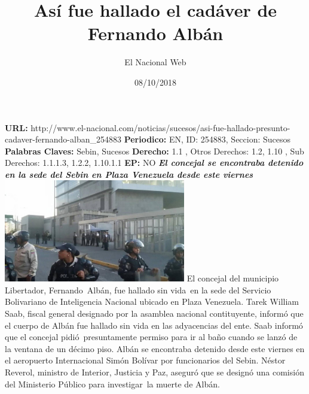 \documentclass{article}%
\title{\textbf{Así fue hallado el cadáver de Fernando Albán}}%
\author{El Nacional Web}%
\date{08/10/2018}%
\begin{document}
%
\normalsize%
\maketitle%
\textbf{URL: }%
http://www.el{-}nacional.com/noticias/sucesos/asi{-}fue{-}hallado{-}presunto{-}cadaver{-}fernando{-}alban\_254883\newline%
%
\textbf{Periodico: }%
EN, %
ID: %
254883, %
Seccion: %
Sucesos\newline%
%
\textbf{Palabras Claves: }%
Sebin, Sucesos\newline%
%
\textbf{Derecho: }%
1.1%
, Otros Derechos: %
1.2, 1.10%
, Sub Derechos: %
1.1.1.3, 1.2.2, 1.10.1.1%
\newline%
%
\textbf{EP: }%
NO\newline%
\newline%
%
\textbf{\textit{El concejal se encontraba detenido en la sede del Sebin en Plaza Venezuela desde este viernes~}}%
\newline%
\newline%
%
\includegraphics[width=300px]{255.jpg}%
\newline%
%
El concejal del municipio Libertador, Fernando~Albán, fue hallado sin vida~en la sede del Servicio Bolivariano de Inteligencia Nacional ubicado en Plaza Venezuela.%
\newline%
%
Tarek William Saab, fiscal general designado por la asamblea nacional contituyente, informó que el cuerpo de Albán fue hallado sin vida en las adyacencias del ente. Saab informó que el concejal pidió~presuntamente permiso para ir al baño cuando se lanzó de la ventana de un décimo piso.%
\newline%
%
Albán se encontraba detenido desde este viernes en el aeropuerto Internacional Simón Bolívar por funcionarios del Sebin. Néstor Reverol, ministro de Interior, Justicia y Paz, aseguró que se designó una comisión del Ministerio Público para investigar~la muerte de Albán.%
\newline%
%
\end{document}

